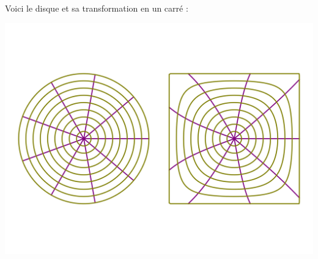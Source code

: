 \documentclass[11pt,class=report,crop=false]{standalone}
\begin{document}
Voici le disque et sa transformation en un carré :
\begin{center}
	\includegraphics[scale=\myscale,scale=0.5,trim={0 2cm 0 2cm},clip]{figures/carre-cercle-04}
\end{center}
\end{document}
